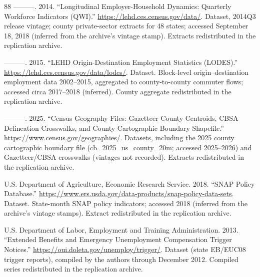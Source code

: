 \documentclass[12pt]{article}
\newcommand{\1}{\mathbf{1}}
\begin{document}
\begin{thebibliography}{88}
---{}---{}---. 2014.
\newblock \enquote{Longitudinal Employer-Household Dynamics: Quarterly Workforce Indicators ({QWI}).}
\newblock \urlprefix\url{https://lehd.ces.census.gov/data/}.
\newblock Dataset, 2014Q3 release vintage; county private-sector extracts for 48 states; accessed September 18, 2018 (inferred from the archive's vintage stamp). Extracts redistributed in the replication archive.

---{}---{}---. 2015.
\newblock \enquote{{LEHD} Origin-Destination Employment Statistics ({LODES}).}
\newblock \urlprefix\url{https://lehd.ces.census.gov/data/lodes/}.
\newblock Dataset. Block-level origin--destination employment data 2002--2015, aggregated to county-to-county commuter flows; accessed circa 2017--2018 (inferred). County aggregate redistributed in the replication archive.

---{}---{}---. 2025.
\newblock \enquote{Census Geography Files: Gazetteer County Centroids, {CBSA} Delineation Crosswalks, and County Cartographic Boundary Shapefile.}
\newblock \urlprefix\url{https://www.census.gov/geographies/}.
\newblock Datasets, including the 2025 county cartographic boundary file (cb\_2025\_us\_county\_20m; accessed 2025--2026) and Gazetteer/{CBSA} crosswalks (vintages not recorded). Extracts redistributed in the replication archive.

{U.S. Department of Agriculture, Economic Research Service}. 2018.
\newblock \enquote{{SNAP} Policy Database.}
\newblock \urlprefix\url{https://www.ers.usda.gov/data-products/snap-policy-data-sets}.
\newblock Dataset. State-month {SNAP} policy indicators; accessed 2018 (inferred from the archive's vintage stamps). Extract redistributed in the replication archive.

{U.S. Department of Labor, Employment and Training Administration}. 2013.
\newblock \enquote{Extended Benefits and Emergency Unemployment Compensation Trigger Notices.}
\newblock \urlprefix\url{https://oui.doleta.gov/unemploy/trigger/}.
\newblock Dataset (state {EB}/{EUC08} trigger reports), compiled by the authors through December 2012. Compiled series redistributed in the replication archive.


\end{thebibliography}
\end{document}
